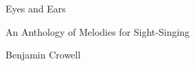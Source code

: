 \thispagestyle{empty}

\vspace*{80mm}

\Huge\sffamily{}Eyes and Ears\mynormaltype

\Large\sffamily{}An Anthology of Melodies for Sight-Singing\mynormaltype

\vspace*{30mm}

\Large\sffamily{}Benjamin Crowell\mynormaltype


